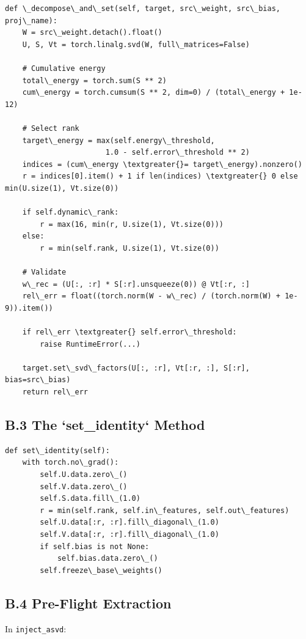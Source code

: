 \begin{lstlisting}
def \_decompose\_and\_set(self, target, src\_weight, src\_bias, proj\_name):
    W = src\_weight.detach().float()
    U, S, Vt = torch.linalg.svd(W, full\_matrices=False)
    
    # Cumulative energy
    total\_energy = torch.sum(S ** 2)
    cum\_energy = torch.cumsum(S ** 2, dim=0) / (total\_energy + 1e-12)
    
    # Select rank
    target\_energy = max(self.energy\_threshold, 
                       1.0 - self.error\_threshold ** 2)
    indices = (cum\_energy \textgreater{}= target\_energy).nonzero()
    r = indices[0].item() + 1 if len(indices) \textgreater{} 0 else min(U.size(1), Vt.size(0))
    
    if self.dynamic\_rank:
        r = max(16, min(r, U.size(1), Vt.size(0)))
    else:
        r = min(self.rank, U.size(1), Vt.size(0))
    
    # Validate
    w\_rec = (U[:, :r] * S[:r].unsqueeze(0)) @ Vt[:r, :]
    rel\_err = float((torch.norm(W - w\_rec) / (torch.norm(W) + 1e-9)).item())
    
    if rel\_err \textgreater{} self.error\_threshold:
        raise RuntimeError(...)
    
    target.set\_svd\_factors(U[:, :r], Vt[:r, :], S[:r], bias=src\_bias)
    return rel\_err
\end{lstlisting}

\subsection{B.3 The `set\_identity` Method}

\begin{lstlisting}
def set\_identity(self):
    with torch.no\_grad():
        self.U.data.zero\_()
        self.V.data.zero\_()
        self.S.data.fill\_(1.0)
        r = min(self.rank, self.in\_features, self.out\_features)
        self.U.data[:r, :r].fill\_diagonal\_(1.0)
        self.V.data[:r, :r].fill\_diagonal\_(1.0)
        if self.bias is not None:
            self.bias.data.zero\_()
        self.freeze\_base\_weights()
\end{lstlisting}

\subsection{B.4 Pre-Flight Extraction}

In \texttt{inject\_asvd}:

